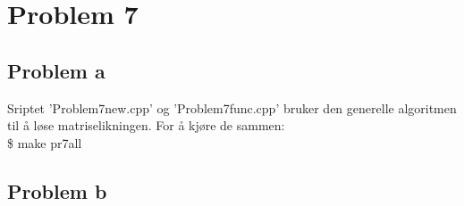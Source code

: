 \documentclass[english,notitlepage]{revtex4-1}  %
\begin{document}

\section*{Problem 7}

\subsection*{Problem a}

Sriptet 'Problem7new.cpp' og 'Problem7func.cpp' bruker den generelle algoritmen  til å løse matriselikningen. For å kjøre de sammen: \\

\$ make pr7all

\subsection*{Problem b}
\end{document}
